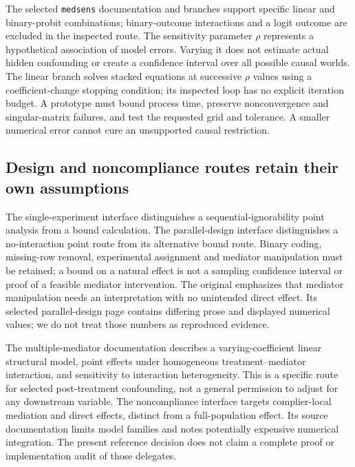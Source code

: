 The selected \texttt{medsens} documentation and branches support specific
linear and binary-probit combinations; binary-outcome interactions and a
logit outcome are excluded in the inspected route. The sensitivity parameter
$\rho$ represents a hypothetical association of model errors. Varying it does
not estimate actual hidden confounding or create a confidence interval over
all possible causal worlds. The linear branch solves stacked equations at
successive $\rho$ values using a coefficient-change stopping condition; its
inspected loop has no explicit iteration budget. A prototype must bound
process time, preserve nonconvergence and singular-matrix failures, and test
the requested grid and tolerance. A smaller numerical error cannot cure an
unsupported causal restriction.
\citep{exec24_mediation_sources,exec24_mediation_original,exec20_med_reference}

\subsection{Design and noncompliance routes retain their own assumptions}
The single-experiment interface distinguishes a sequential-ignorability point
analysis from a bound calculation. The parallel-design interface distinguishes
a no-interaction point route from its alternative bound route. Binary coding,
missing-row removal, experimental assignment and mediator manipulation must be
retained; a bound on a natural effect is not a sampling confidence interval
or proof of a feasible mediator intervention. The original emphasizes that
mediator manipulation needs an interpretation with no unintended direct effect.
Its selected parallel-design page contains differing prose and displayed
numerical values; we do not treat those numbers as reproduced evidence.
\citep{exec24_mediation_sources,exec24_mediation_original}

The multiple-mediator documentation describes a varying-coefficient linear
structural model, point effects under homogeneous treatment--mediator
interaction, and sensitivity to interaction heterogeneity. This is a specific
route for selected post-treatment confounding, not a general permission to
adjust for any downstream variable. The noncompliance interface targets
complier-local mediation and direct effects, distinct from a full-population
effect. Its source documentation limits model families and notes potentially
expensive numerical integration. The present reference decision does not
claim a complete proof or implementation audit of those delegates.
\citep{exec24_mediation_sources}

